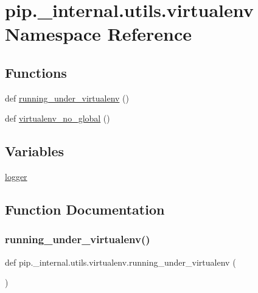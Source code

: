 \hypertarget{namespacepip_1_1__internal_1_1utils_1_1virtualenv}{}\section{pip.\+\_\+internal.\+utils.\+virtualenv Namespace Reference}
\label{namespacepip_1_1__internal_1_1utils_1_1virtualenv}
\subsection*{Functions}
\begin{DoxyCompactItemize}
\item 
def \hyperlink{namespacepip_1_1__internal_1_1utils_1_1virtualenv_ace91d91e112c91f1e6cc083f9ffdd73e}{running\+\_\+under\+\_\+virtualenv} ()
\item 
def \hyperlink{namespacepip_1_1__internal_1_1utils_1_1virtualenv_a997fd41c824f9d20f4e4083b65fc7759}{virtualenv\+\_\+no\+\_\+global} ()
\end{DoxyCompactItemize}
\subsection*{Variables}
\begin{DoxyCompactItemize}
\item 
\hyperlink{namespacepip_1_1__internal_1_1utils_1_1virtualenv_a72e923841cf07d9c11d0b94b81596d5d}{logger}
\end{DoxyCompactItemize}


\subsection{Function Documentation}
\mbox{\label{namespacepip_1_1__internal_1_1utils_1_1virtualenv_ace91d91e112c91f1e6cc083f9ffdd73e}} 
\subsubsection{\texorpdfstring{running\+\_\+under\+\_\+virtualenv()}{running\_under\_virtualenv()}}
{\footnotesize\ttfamily def pip.\+\_\+internal.\+utils.\+virtualenv.\+running\+\_\+under\+\_\+virtualenv (\begin{DoxyParamCaption}{ }\end{DoxyParamCaption})}

